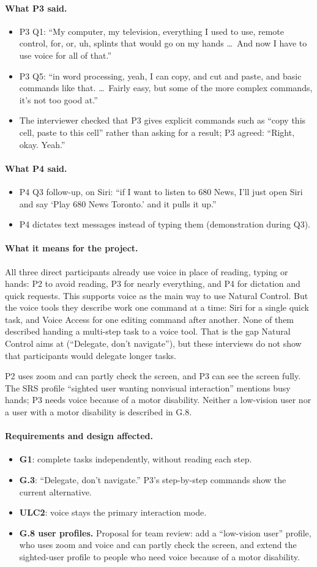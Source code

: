 \documentclass[12pt, titlepage]{article}
\newcommand{\saidthree}{\paragraph{What P3 said.}}
\newcommand{\saidfour}{\paragraph{What P4 said.}}
\newcommand{\means}{\paragraph{What it means for the project.}}
\newcommand{\affects}{\paragraph{Requirements and design affected.}}
\begin{document}
\saidthree
\begin{itemize}
    \item P3 Q1: ``My computer, my television, everything I used to use, remote control, for, or, uh, splints that would go on my hands \ldots\ And now I have to use voice for all of that.''
    \item P3 Q5: ``in word processing, yeah, I can copy, and cut and paste, and basic commands like that. \ldots\ Fairly easy, but some of the more complex commands, it's not too good at.''
    \item The interviewer checked that P3 gives explicit commands such as ``copy this cell, paste to this cell'' rather than asking for a result; P3 agreed: ``Right, okay. Yeah.''
\end{itemize}

\saidfour
\begin{itemize}
    \item P4 Q3 follow-up, on Siri: ``if I want to listen to 680 News, I'll just open Siri and say `Play 680 News Toronto.' and it pulls it up.''
    \item P4 dictates text messages instead of typing them (demonstration during Q3).
\end{itemize}

\means
All three direct participants already use voice in place of reading, typing or hands: P2 to avoid reading, P3 for nearly everything, and P4 for dictation and quick requests. This supports voice as the main way to use Natural Control. But the voice tools they describe work one command at a time: Siri for a single quick task, and Voice Access for one editing command after another. None of them described handing a multi-step task to a voice tool. That is the gap Natural Control aims at (``Delegate, don't navigate''), but these interviews do not show that participants would delegate longer tasks.

P2 uses zoom and can partly check the screen, and P3 can see the screen fully. The SRS profile ``sighted user wanting nonvisual interaction'' mentions busy hands; P3 needs voice because of a motor disability. Neither a low-vision user nor a user with a motor disability is described in G.8.

\affects
\begin{itemize}
    \item \textbf{G1}: complete tasks independently, without reading each step.
    \item \textbf{G.3}: ``Delegate, don't navigate.'' P3's step-by-step commands show the current alternative.
    \item \textbf{ULC2}: voice stays the primary interaction mode.
    \item \textbf{G.8 user profiles.} Proposal for team review: add a ``low-vision user'' profile, who uses zoom and voice and can partly check the screen, and extend the sighted-user profile to people who need voice because of a motor disability.
\end{itemize}
\end{document}
